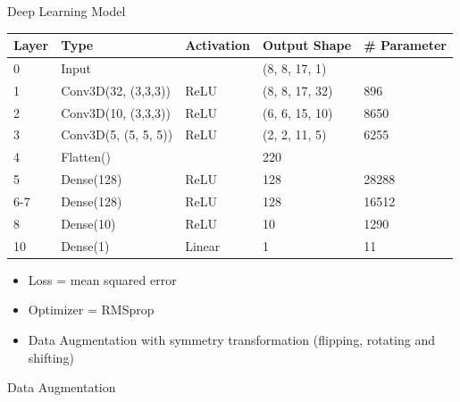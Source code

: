 \documentclass[10pt]{beamer}
\begin{document}
\begin{frame}{Deep Learning Model}
  \centering
  \begin{tabular}{l|l|l|l|l}
    Layer & Type  & Activation & Output Shape & \# Parameter \\
    \hline
    0     & Input &            & (8, 8, 17, 1) &  \\
    1   & Conv3D(32, (3,3,3)) & ReLU & (8, 8, 17, 32)   & 896   \\
    2   & Conv3D(10, (3,3,3)) & ReLU & (6, 6, 15, 10)   & 8650  \\
    3   &  Conv3D(5, (5, 5, 5)) & ReLU & (2, 2, 11, 5)  & 6255  \\
    4     & Flatten()  & & 220 &               \\
    5   & Dense(128)                          & ReLU & 128 & 28288          \\
    6-7 & Dense(128)  & ReLU & 128 & 16512 \\
    8     & Dense(10)                           & ReLU & 10 & 1290         \\
    10     & Dense(1)                            & Linear   & 1 & 11 
  \end{tabular}
  \begin{itemize}
  \item Loss = mean squared error
  \item Optimizer = RMSprop
  \item Data Augmentation with symmetry transformation (flipping, rotating and shifting)
  \end{itemize}
\end{frame}

\begin{frame}{Data Augmentation}
  
\end{frame}
\end{document}
